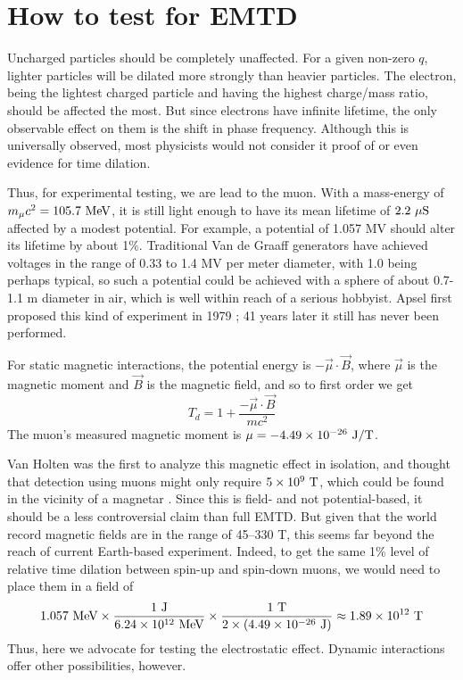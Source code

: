 \section{How to test for EMTD}
\label{sec:5}

Uncharged particles should be completely unaffected.
For a given non-zero $q$, lighter particles will be dilated more strongly than heavier particles.
The electron, being the lightest charged particle and having the highest charge/mass ratio,
should be affected the most.
But since electrons have infinite lifetime,
the only observable effect on them is the shift in phase frequency.
Although this is universally observed,
most physicists would not consider it proof of or even evidence for time dilation.

Thus, for experimental testing, we are lead to the muon.
With a mass-energy of $m_\mu c^2 = 105.7\ \textup{MeV}$,
it is still light enough to have its mean lifetime of $2.2\ \mu \textup{S}$
affected by a modest potential.
For example, a potential of 1.057 MV should alter its lifetime by about 1\%.
Traditional Van de Graaff generators have achieved voltages in the range of
0.33 to 1.4 MV per meter diameter, with 1.0 being perhaps typical,
so such a potential could be achieved
with a sphere of about 0.7-1.1 m diameter in air,
which is well within reach of a serious hobbyist.
Apsel first proposed this kind of experiment in 1979 \cite{Apsel1979};
41 years later it still has never been performed.

For static magnetic interactions, the potential energy is $-\vec{\mu}\cdot\vec{B}$,
where $\vec{\mu}$ is the magnetic moment and $\vec{B}$ is the magnetic field,
and so to first order we get
\begin{equation}\label{mtd}
T_d =  1 + \frac{-\vec{\mu}\cdot\vec{B}}{mc^2}
\end{equation}
The muon's measured magnetic moment is
$\mu = -4.49 \times 10^{-26}\ \textup{J}/\textup{T}$.

Van Holten was the first to analyze this magnetic effect in isolation,
and thought that detection using muons might only require $5 \times 10^9\ \textup{T}$,
which could be found in the vicinity of a magnetar \cite{vanHolten1992}.
Since this is field- and not potential-based,
it should be a less controversial claim than full EMTD.
But given that the world record magnetic fields are in the range of 45--330 T,
this seems far beyond the reach of current Earth-based experiment.
Indeed, to get the same 1\% level of relative time dilation between spin-up and spin-down muons,
we would need to place them in a field of
\begin{equation}
1.057\ \textup{MeV} \times \frac{1\ \textup{J}}{6.24\times 10^{12}\ \textup{MeV}} \times \frac{1\ \textup{T}}{2 \times (4.49 \times 10^{-26}\ \textup{J})} \approx 1.89 \times 10^{12}\ \textup{T}
\end{equation}
Thus, here we advocate for testing the electrostatic effect.
Dynamic interactions offer other possibilities, however. \cite{Apsel1979}

